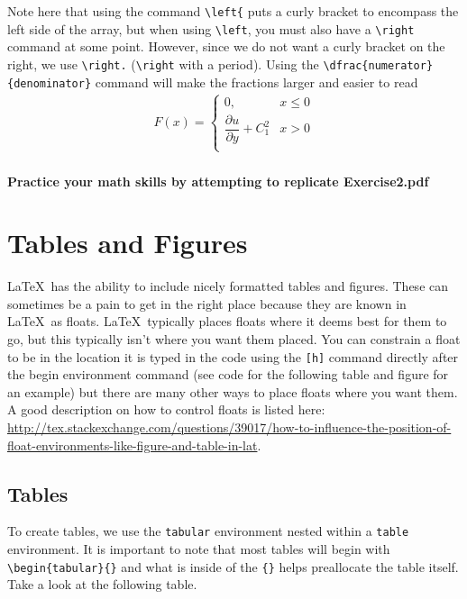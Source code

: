 \documentclass[]{article}%
\newcommand{\bs}{\textbackslash}
\newcommand{\TT}[1]{\texttt{#1}}
\newcommand{\tpc}{\textperiodcentered}
\theoremstyle{definition}
\begin{document}
	Note here that using the command \TT{\bs left\{} puts a curly bracket to encompass the left side of the array, but when using \TT{\bs left}, you must also have a \TT{\bs right} command at some point. However, since we do not want a curly bracket on the right, we use \TT{\bs right.} (\TT{\bs right} with a period). 
	Using the \TT{\bs dfrac\{numerator\}\{denominator\}} command will make the fractions larger and easier to read
	\begin{align}
		\label{eq:exampledel}
		F(x) = \left\{ 
		\begin{array}{ll}
			0, & x \leq 0 \\
			\dfrac{\partial u}{\partial y} + C_1^2  & x > 0\\
		\end{array}
		\right. 
	\end{align}
	
	\paragraph{Practice your math skills by attempting to replicate Exercise2.pdf}
	\clearpage
	
	
	\section{Tables and Figures}
	\LaTeX\ has the ability to include nicely formatted tables and figures.
	These can sometimes be a pain to get in the right place because they are known in \LaTeX\ as floats.
	\LaTeX\ typically places floats where it deems best for them to go, but this typically isn't where you want them placed.
	You can constrain a float to be in the location it is typed in the code using the \texttt{[h]} command directly after the begin environment command (see code for the following table and figure for an example) but there are many other ways to place floats where you want them.
	A good description on how to control floats is listed here: \url{http://tex.stackexchange.com/questions/39017/how-to-influence-the-position-of-float-environments-like-figure-and-table-in-lat}.
	
	\label{sec:tablesfigures}
	\subsection{Tables}
	To create tables, we use the \TT{tabular} environment nested within a \TT{table} environment.
	It is important to note that most tables will begin with \TT{\bs begin\{tabular\}\{\tpc\}} and what is inside of the \TT{\{\tpc\}} helps preallocate the table itself.
	Take a look at the following table.
	
\end{document}
